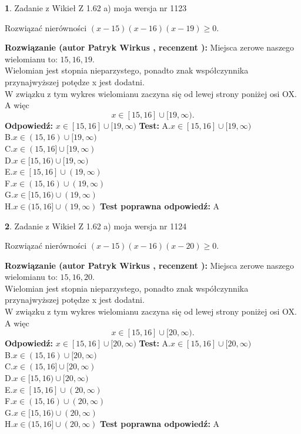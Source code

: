 \documentclass[12pt, a4paper]{article}
\theoremstyle{definition} %
\newtheorem{zad}{}
\newcommand{\zadStart}[1]{\begin{zad}#1\newline}
\newcommand{\zadStop}{\end{zad}}
\newcommand{\rozwStart}[2]{\noindent \textbf{Rozwiązanie (autor #1 , recenzent #2): }\newline}
\newcommand{\rozwStop}{\newline}
\newcommand{\odpStart}{\noindent \textbf{Odpowiedź:}\newline}
\newcommand{\odpStop}{\newline}
\newcommand{\testStart}{\noindent \textbf{Test:}\newline}
\newcommand{\testStop}{\newline}
\newcommand{\kluczStart}{\noindent \textbf{Test poprawna odpowiedź:}\newline}
\newcommand{\kluczStop}{\newline}
\begin{document}
\zadStart{Zadanie z Wikieł Z 1.62 a) moja wersja nr 1123}

Rozwiązać nierówności $(x-15)(x-16)(x-19)\ge0$.
\zadStop
\rozwStart{Patryk Wirkus}{}
Miejsca zerowe naszego wielomianu to: $15, 16, 19$.\\
Wielomian jest stopnia nieparzystego, ponadto znak współczynnika przy\linebreak najwyższej potędze x jest dodatni.\\ W związku z tym wykres wielomianu zaczyna się od lewej strony poniżej osi OX. A więc $$x \in [15,16] \cup [19,\infty).$$
\rozwStop
\odpStart
$x \in [15,16] \cup [19,\infty)$
\odpStop
\testStart
A.$x \in [15,16] \cup [19,\infty)$\\
B.$x \in (15,16) \cup [19,\infty)$\\
C.$x \in (15,16] \cup [19,\infty)$\\
D.$x \in [15,16) \cup [19,\infty)$\\
E.$x \in [15,16] \cup (19,\infty)$\\
F.$x \in (15,16) \cup (19,\infty)$\\
G.$x \in [15,16) \cup (19,\infty)$\\
H.$x \in (15,16] \cup (19,\infty)$
\testStop
\kluczStart
A
\kluczStop



\zadStart{Zadanie z Wikieł Z 1.62 a) moja wersja nr 1124}

Rozwiązać nierówności $(x-15)(x-16)(x-20)\ge0$.
\zadStop
\rozwStart{Patryk Wirkus}{}
Miejsca zerowe naszego wielomianu to: $15, 16, 20$.\\
Wielomian jest stopnia nieparzystego, ponadto znak współczynnika przy\linebreak najwyższej potędze x jest dodatni.\\ W związku z tym wykres wielomianu zaczyna się od lewej strony poniżej osi OX. A więc $$x \in [15,16] \cup [20,\infty).$$
\rozwStop
\odpStart
$x \in [15,16] \cup [20,\infty)$
\odpStop
\testStart
A.$x \in [15,16] \cup [20,\infty)$\\
B.$x \in (15,16) \cup [20,\infty)$\\
C.$x \in (15,16] \cup [20,\infty)$\\
D.$x \in [15,16) \cup [20,\infty)$\\
E.$x \in [15,16] \cup (20,\infty)$\\
F.$x \in (15,16) \cup (20,\infty)$\\
G.$x \in [15,16) \cup (20,\infty)$\\
H.$x \in (15,16] \cup (20,\infty)$
\testStop
\kluczStart
A
\kluczStop
\end{document}
